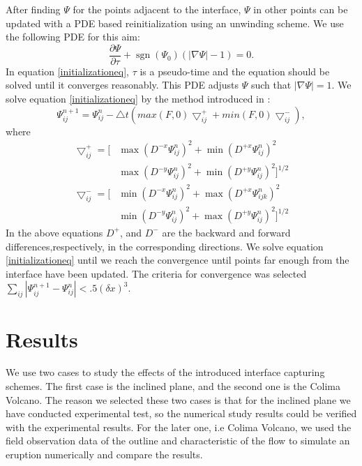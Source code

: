 \documentclass[letterpaper,10pt]{article}
\DeclareMathOperator{\sgn}{sgn}
\begin{document}
After finding $\varPsi$ for the points adjacent to the interface, $\varPsi$ in other points can be updated with a PDE based reinitialization using an unwinding scheme. 
We use the following PDE for this aim:
\begin{equation}\label{initializationeq}
        \frac{\partial \varPsi}{\partial \tau} + \sgn (\varPsi_0) (|\nabla \varPsi| - 1)= 0.
\end{equation}
In equation \eqref{initializationeq}, $\tau$ is a pseudo-time and the equation should be solved until it converges reasonably. This PDE adjusts $\varPsi$ such that $|\nabla \varPsi|=1$.
We solve equation \eqref{initializationeq} by the method introduced in \cite{Adalsteinsson1999}:
\begin{equation}
        \varPsi_{ij}^{n+1}=\varPsi_{ij}^{n}-\bigtriangleup t \left(max(F,0)\bigtriangledown_{ij}^{+}+min(F,0)\bigtriangledown_{ij}^{-} \right),
\end{equation}
where 
\begin{equation}
        \begin{aligned}
                \bigtriangledown_{ij}^{+} = \big[ & \max(D^{-x}\varPsi_{ij}^{n})^2 + \min(D^{+x}\varPsi_{ij}^{n})^2
                \\& \max(D^{-y}\varPsi_{ij}^{n})^2 + \min(D^{+y}\varPsi_{ij}^{n})^2 \big]^{1/2}
        \end{aligned}
\end{equation}
\begin{equation}
        \begin{aligned}
                \bigtriangledown_{ij}^{-} = \big[ & \min(D^{-x}\varPsi_{ij}^{n})^2 + \max(D^{+x}\varPsi_{ijk}^{n})^2
                \\& \min(D^{-y}\varPsi_{ij}^{n})^2 + \max(D^{+y}\varPsi_{ij}^{n})^2 \big]^{1/2}
        \end{aligned}
\end{equation} 
In the above equations $D^+$, and $D^-$ are the backward and forward differences,respectively, in the corresponding directions.
We solve equation \eqref{initializationeq} until we reach the convergence until points far enough from the interface have been updated.
The criteria for convergence was selected $\sum\limits_{ij}|\varPsi_{ij}^{n+1} -\varPsi_{ij}^{n}| < .5 (\delta x)^3$. 
\section{Results} \label{results}
We use two cases to study the effects of the introduced interface capturing schemes. The first case is the inclined plane, and the second one is the Colima Volcano. The reason we selected these two cases is that for the inclined plane we have conducted experimental test, so the numerical study results could be verified with the experimental results. For the later one, i.e Colima Volcano, we used the field observation data of the outline and characteristic of the flow to simulate an eruption numerically and compare the results.
\end{document}
